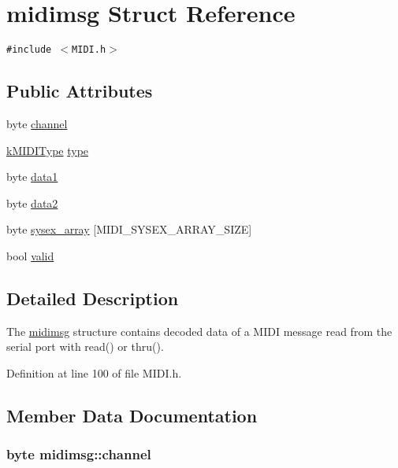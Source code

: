 \hypertarget{structmidimsg}{
\section{midimsg Struct Reference}
\label{structmidimsg}
}
{\tt \#include $<$MIDI.h$>$}

\subsection*{Public Attributes}
\begin{CompactItemize}
\item 
byte \hyperlink{structmidimsg_b0be990f365123787ec088f55ae6e46b}{channel}
\item 
\hyperlink{_m_i_d_i_8h_802feb46a169642d43b2415d02390545}{kMIDIType} \hyperlink{structmidimsg_c2aa51d6154e6434f4426f925c6e5287}{type}
\item 
byte \hyperlink{structmidimsg_d0a225fbc23de9f631331d6aa52ab981}{data1}
\item 
byte \hyperlink{structmidimsg_240be209353b132d10757bf345146e6b}{data2}
\item 
byte \hyperlink{structmidimsg_253df8383f977227e7d45ba488d98601}{sysex\_\-array} \mbox{[}MIDI\_\-SYSEX\_\-ARRAY\_\-SIZE\mbox{]}
\item 
bool \hyperlink{structmidimsg_dd91395b86cb7ace5ba8c1654ab61d2e}{valid}
\end{CompactItemize}


\subsection{Detailed Description}
The \hyperlink{structmidimsg}{midimsg} structure contains decoded data of a MIDI message read from the serial port with read() or thru(). \par
 

Definition at line 100 of file MIDI.h.

\subsection{Member Data Documentation}
\hypertarget{structmidimsg_b0be990f365123787ec088f55ae6e46b}{
\subsubsection[{channel}]{\setlength{\rightskip}{0pt plus 5cm}byte {\bf midimsg::channel}}}
\label{structmidimsg_b0be990f365123787ec088f55ae6e46b}


